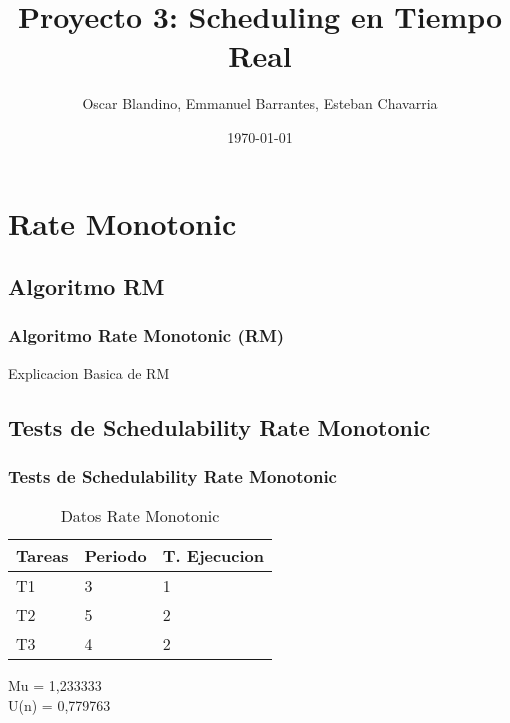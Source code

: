 \documentclass[xcolor=table]{beamer}
\title[Proyecto 3]{Proyecto 3: Scheduling en Tiempo Real} %
\author{Oscar Blandino, Emmanuel Barrantes, Esteban Chavarria} %
\institute[TEC] %
{
Tecnologico de Costa Rica \\ %
Sistemas Operativos Avanzados \\
I Semestre - 2018
\medskip
\textit{} %
}
\date{\today} %
\begin{document}
\begin{frame}
\titlepage %
\end{frame}



\section{Rate Monotonic}

\subsection{Algoritmo RM}

\begin{frame} 
\frametitle{Algoritmo Rate Monotonic (RM)} 
Explicacion Basica de RM \\
\end{frame}

\subsection{Tests de Schedulability  Rate Monotonic } 

\begin{frame} 
\frametitle{Tests de Schedulability  Rate Monotonic } 
\begin{table} 
\centering 
\begin{tabular}{|l|l|l|} 
\hline 
Tareas & Periodo & T. Ejecucion \\ \hline 
T1   & 3  &  1\\ \hline 
T2   & 5  &  2\\ \hline 
T3   & 4  &  2\\ \hline 
\end{tabular} 
\caption{Datos  Rate Monotonic } 
\end{table} 
Mu =  1,233333 \\ 
U(n) =  0,779763 \\ 
\end{frame} 
\end{document}
